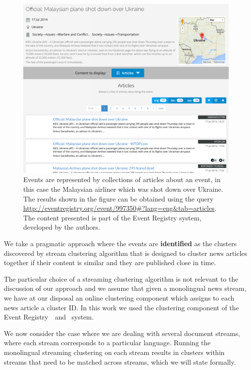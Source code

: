\begin{figure}
\centering
\includegraphics[width=1\textwidth]{figures/events2.png}
\caption{\label{fig:event2} Events are represented by collections of articles about an event, in
this case the Malaysian airliner which was shot down over Ukraine. The results shown in the figure can be obtained using the query \url{http://eventregistry.org/event/997350\#?lang=eng\&tab=articles}. The
content presented is part of the Event Registry system, developed by the authors.}
\end{figure}


We take a pragmatic approach where the events are \textbf{identified} as the clusters
discovered by stream clustering algorithm that is designed to cluster
news articles together if their content is similar and they are published
close in time.

The particular choice of a streaming clustering algorithm is not relevant
to the discussion of our approach and we assume that given a monolingual news stream, we have
at our disposal an online clustering component which assigns to each news
article a cluster ID. In this work we used the clustering
component of the Event Registry~\cite{Leban2014W}~and~\cite{Leban2014I} system.

We now consider the case where we are dealing with several document streams, where each
stream corresponds to a particular language. Running the monolingual streaming clustering
on each stream results in clusters within streams that need to be matched across streams,
which we will state formally.

